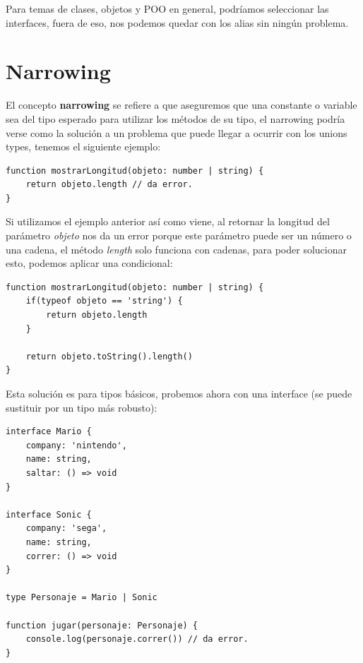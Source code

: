 Para temas de clases, objetos y POO en general, podríamos seleccionar las interfaces, fuera de eso, nos podemos quedar con los alias sin ningún problema.



\section{Narrowing}

El concepto \textbf{narrowing} se refiere a que aseguremos que una constante o variable sea del tipo esperado para utilizar los métodos de su tipo, el narrowing podría verse como la solución a un problema que puede llegar a ocurrir con los unions types, tenemos el siguiente ejemplo:
\begin{lstlisting}
function mostrarLongitud(objeto: number | string) {
    return objeto.length // da error.
}
\end{lstlisting}

Si utilizamos el ejemplo anterior así como viene, al retornar la longitud del parámetro \textit{objeto} nos da un error porque este parámetro puede ser un número o una cadena, el método \textit{length} solo funciona con cadenas, para poder solucionar esto, podemos aplicar una condicional:
\begin{lstlisting}
function mostrarLongitud(objeto: number | string) {
    if(typeof objeto == 'string') {
        return objeto.length
    }

    return objeto.toString().length()
}
\end{lstlisting}

Esta solución es para tipos básicos, probemos ahora con una interface (se puede sustituir por un tipo más robusto):
\begin{lstlisting}
interface Mario {
    company: 'nintendo',
    name: string,
    saltar: () => void
}

interface Sonic {
    company: 'sega',
    name: string,
    correr: () => void
}

type Personaje = Mario | Sonic

function jugar(personaje: Personaje) {
    console.log(personaje.correr()) // da error.
}
\end{lstlisting}

